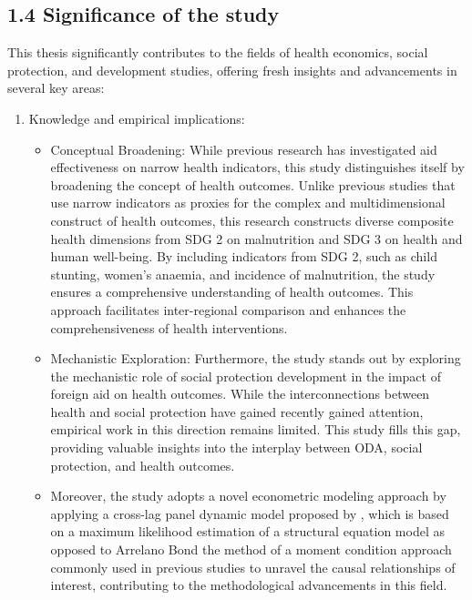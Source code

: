 \subsection*{1.4	Significance of the study}
This thesis significantly contributes to the fields of health economics, social protection, and development studies, offering fresh insights and advancements in several key areas:
\begin{enumerate}[i]
    \item Knowledge and empirical implications: 
    \begin{itemize}
        \item Conceptual Broadening: While previous research has investigated aid effectiveness on narrow health indicators, this study distinguishes itself by broadening the concept of health outcomes. Unlike previous studies that use narrow indicators as proxies for the complex and multidimensional construct of health outcomes, this research constructs diverse composite health dimensions from SDG 2 on malnutrition and SDG 3 on health and human well-being. By including indicators from SDG 2, such as child stunting, women’s anaemia, and incidence of malnutrition, the study ensures a comprehensive understanding of health outcomes. This approach facilitates inter-regional comparison and enhances the comprehensiveness of health interventions.
    \item Mechanistic Exploration: Furthermore, the study stands out by exploring the mechanistic role of social protection development in the impact of foreign aid on health outcomes. While the interconnections between health and social protection have gained recently gained attention, empirical work in this direction remains limited. This study fills this gap, providing valuable insights into the interplay between ODA, social protection, and health outcomes.
    \item Moreover, the study adopts a novel econometric modeling approach by applying a cross-lag panel dynamic model proposed by \textcite{allison2017maximum, moral2019dynamic}, which is based on a maximum likelihood estimation of a structural equation model as opposed to Arrelano Bond the method of a moment condition approach commonly used in previous studies to unravel the causal relationships of interest, contributing to the methodological advancements in this field.
    \end{itemize}
    

\end{enumerate}
